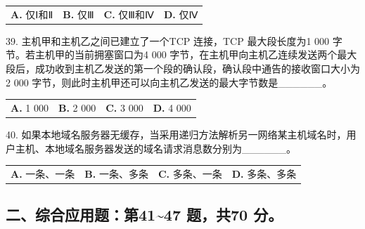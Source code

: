 \documentclass[UTF8,11pt]{ctexart}
\begin{document}
\begin{center}\begin{tabular}{>{\raggedright\arraybackslash}p{\dimexpr(\linewidth-8\tabcolsep)/4\relax}>{\raggedright\arraybackslash}p{\dimexpr(\linewidth-8\tabcolsep)/4\relax}>{\raggedright\arraybackslash}p{\dimexpr(\linewidth-8\tabcolsep)/4\relax}>{\raggedright\arraybackslash}p{\dimexpr(\linewidth-8\tabcolsep)/4\relax}}
\textbf{A.} 仅Ⅰ和Ⅱ & \textbf{B.} 仅Ⅲ & \textbf{C.} 仅Ⅲ和Ⅳ & \textbf{D.} 仅Ⅳ\\[.35em]\end{tabular}\end{center}

39. 主机甲和主机乙之间已建立了一个TCP 连接，TCP 最大段长度为1 000 字节。若主机甲的当前拥塞窗口为4 000 字节，在主机甲向主机乙连续发送两个最大段后，成功收到主机乙发送的第一个段的确认段，确认段中通告的接收窗口大小为2 000 字节，则此时主机甲还可以向主机乙发送的最大字节数是\_\_\_\_\_\_。


\begin{center}\begin{tabular}{>{\raggedright\arraybackslash}p{\dimexpr(\linewidth-8\tabcolsep)/4\relax}>{\raggedright\arraybackslash}p{\dimexpr(\linewidth-8\tabcolsep)/4\relax}>{\raggedright\arraybackslash}p{\dimexpr(\linewidth-8\tabcolsep)/4\relax}>{\raggedright\arraybackslash}p{\dimexpr(\linewidth-8\tabcolsep)/4\relax}}
\textbf{A.} 1 000 & \textbf{B.} 2 000 & \textbf{C.} 3 000 & \textbf{D.} 4 000\\[.35em]\end{tabular}\end{center}

40. 如果本地域名服务器无缓存，当采用递归方法解析另一网络某主机域名时，用户主机、本地域名服务器发送的域名请求消息数分别为\_\_\_\_\_\_。


\begin{center}\begin{tabular}{>{\raggedright\arraybackslash}p{\dimexpr(\linewidth-8\tabcolsep)/4\relax}>{\raggedright\arraybackslash}p{\dimexpr(\linewidth-8\tabcolsep)/4\relax}>{\raggedright\arraybackslash}p{\dimexpr(\linewidth-8\tabcolsep)/4\relax}>{\raggedright\arraybackslash}p{\dimexpr(\linewidth-8\tabcolsep)/4\relax}}
\textbf{A.} 一条、一条 & \textbf{B.} 一条、多条 & \textbf{C.} 多条、一条 & \textbf{D.} 多条、多条\\[.35em]\end{tabular}\end{center}

\subsection*{二、综合应用题：第41\textasciitilde{}47 题，共70 分。}
\end{document}
